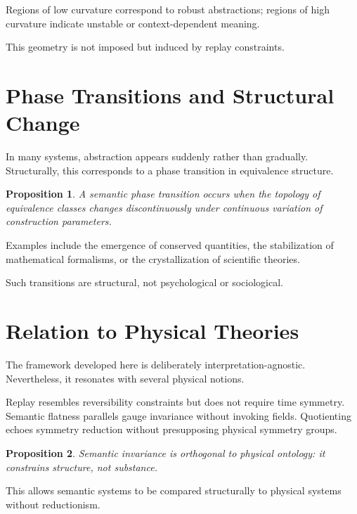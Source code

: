\documentclass[11pt]{article}
\newtheorem{proposition}{Proposition}[section]
\begin{document}
Regions of low curvature correspond to robust abstractions; regions of high curvature indicate unstable or context-dependent meaning.

This geometry is not imposed but induced by replay constraints.

\section{Phase Transitions and Structural Change}

In many systems, abstraction appears suddenly rather than gradually. Structurally, this corresponds to a phase transition in equivalence structure.

\begin{proposition}
A semantic phase transition occurs when the topology of equivalence classes changes discontinuously under continuous variation of construction parameters.
\end{proposition}

Examples include the emergence of conserved quantities, the stabilization of mathematical formalisms, or the crystallization of scientific theories.

Such transitions are structural, not psychological or sociological.

\section{Relation to Physical Theories}

The framework developed here is deliberately interpretation-agnostic. Nevertheless, it resonates with several physical notions.

Replay resembles reversibility constraints but does not require time symmetry. Semantic flatness parallels gauge invariance without invoking fields. Quotienting echoes symmetry reduction without presupposing physical symmetry groups.

\begin{proposition}
Semantic invariance is orthogonal to physical ontology: it constrains structure, not substance.
\end{proposition}

This allows semantic systems to be compared structurally to physical systems without reductionism.
\end{document}

